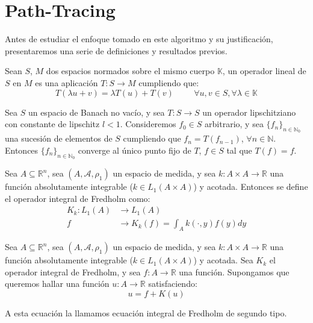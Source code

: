 \section{Path-Tracing}
Antes de estudiar el enfoque tomado en este algoritmo y su justificación, presentaremos una serie de definiciones y resultados previos.

\begin{definicion}
  Sean $S$, $M$ dos espacios normados sobre el mismo cuerpo $\mathds{K}$, un operador lineal de $S$ en $M$ es una aplicación $T:S\rightarrow M$ cumpliendo que:
  $$T(\lambda u + v) = \lambda T(u) + T(v)\hspace{1cm} \forall u,v\in S, \forall \lambda\in\mathds{K} $$
\end{definicion}

\begin{teorema}
Sea $S$ un espacio de Banach no vacío, y sea $T:S\rightarrow S$ un operador lipschitziano con constante de lipschitz $l<1$. Consideremos $f_0\in S$ arbitrario, y sea $\{f_n\}_{n\in\mathds{N}_0}$ una sucesión de elementos de $S$ cumpliendo que $f_n = T(f_{n-1})$, $\forall n\in\mathds{N}$. Entonces $\{f_n\}_{n\in\mathds{N}_0}$ converge al único punto fijo de $T$, $f\in S$ tal que $T(f)=f$.
\end{teorema}

\begin{definicion}
  Sea $A\subseteq \mathds{R}^n$, sea $(A, \mathcal{A}, \rho_1)$ un espacio de medida, y sea $k:A\times A\rightarrow \mathds{R}$ una función absolutamente integrable ($k\in L_1(A\times A)$) y acotada. Entonces se define el operador integral de Fredholm como:
  \begin{align*}
    K_k:L_1(A)&\rightarrow L_1(A)\\
    f&\rightarrow K_k(f) = \int_A k(\cdot,y) f(y) dy
  \end{align*}  
\end{definicion}

\begin{definicion}
  Sea $A\subseteq \mathds{R}^n$, sea $(A, \mathcal{A}, \rho_1)$ un espacio de medida, y sea $k:A\times A\rightarrow \mathds{R}$ una función absolutamente integrable ($k\in L_1(A\times A)$) y acotada. Sea $K_k$ el operador integral de Fredholm, y sea $f:A\rightarrow \mathds{R}$ una función. Supongamos que queremos hallar una función $u:A\rightarrow \mathds{R}$ satisfaciendo:
$$u = f+K(u) $$

  A esta ecuación la llamamos ecuación integral de Fredholm de segundo tipo.
  \end{definicion}

